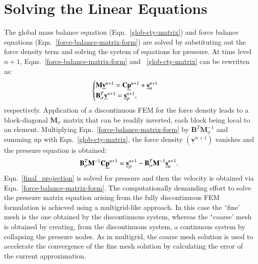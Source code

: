 \documentclass[preprint,authoryear,12pt]{elsarticle}
\begin{document}
\section{Solving the Linear Equations}\label{Section:SolvingLinearEqns}
The global mass balance equation (Eqn.~\ref{glob-cty-matrix}) and force balance equations (Eqn.~\ref{force-balance-matrix-form}) are solved by substituting out the force density term and solving the system of equations for pressure. At time level $n+1$, Eqns.~\ref{force-balance-matrix-form} and ~\ref{glob-cty-matrix} can be rewritten as:
\begin{displaymath}
\begin{cases}
 \mathbf{M} \underline{\bf v}^{n+1} = \mathbf{C}\underline{\bf p}^{n+1} + \underline{\bf s}_{u}^{n+1} \\ %
 \mathbf{B}_\sigma^{T} \underline{\bf v}^{n+1} = \underline{\bf s}_{p}^{n+1},%
\end{cases}
\end{displaymath}
respectively. Application of a discontinuous FEM for the force density leads to a block-diagonal $\mathbf{M}_{\sigma}$ matrix that can be readily inverted, each block being local to an element. Multiplying Eqn.~\ref{force-balance-matrix-form} by $\mathbf{B}^{T}\mathbf{M}_{\sigma}^{-1}$ and summing up with Eqn.~\ref{glob-cty-matrix}, the force density $\left(\underline{\mathbf v}^{n+1}\right)$ vanishes and the pressure equation is obtained:
\begin{equation}
  \mathbf{B}_\sigma^{T}\mathbf{M}^{-1} \mathbf{C} \underline{\bf p}^{n+1} = \underline{\bf s}_{p}^{n+1} - \mathbf{B}_\sigma^{T} \mathbf{M}^{-1} \underline{\bf s}_{u}^{n+1}.
  \label{final_projection}
\end{equation}
Eqn.~\ref{final_projection} is solved for pressure and then the velocity is obtained via Eqn.~\ref{force-balance-matrix-form}. The computationally demanding effort to solve the pressure matrix equation arising from the fully discontinuous FEM formulation is achieved using a multigrid-like approach. In this case the $\lq$fine' mesh is the one obtained by the discontinuous system, whereas the $\lq$coarse' mesh is obtained by creating, from the discontinuous system, a continuous system by collapsing the pressure nodes. As in multigrid, the coarse mesh solution is used to accelerate the convergence of the fine mesh solution by calculating the error of the current approximation.
\end{document}
